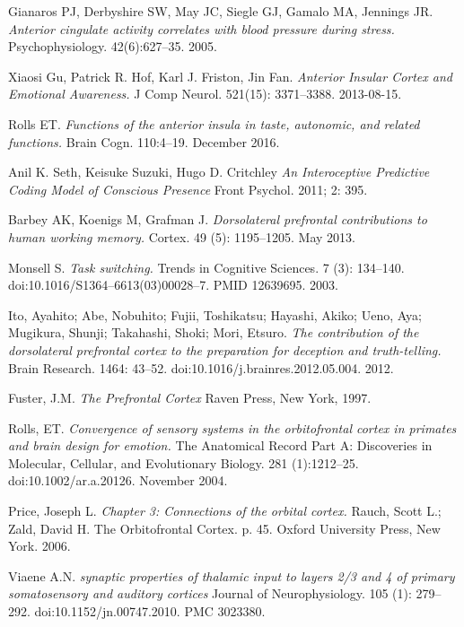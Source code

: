 \documentclass[a4paper, amsfonts, amssymb, amsmath, reprint, showkeys, nofootinbib, twoside]{revtex4-1}
\begin{document}
\begin{thebibliography}{99}
  Gianaros PJ, Derbyshire SW, May JC, Siegle GJ, Gamalo MA, Jennings JR.
  \textit{Anterior cingulate activity correlates with blood pressure during
    stress.}
  Psychophysiology. 42(6):627–35. 2005.

  Xiaosi Gu, Patrick R. Hof, Karl J. Friston, Jin Fan.
  \textit{Anterior Insular Cortex and Emotional Awareness.}
  J Comp Neurol. 521(15): 3371–3388. 2013-08-15.

  Rolls ET.
  \textit{Functions of the anterior insula in taste, autonomic, and related
    functions.}
  Brain Cogn. 110:4–19. December 2016.

  Anil K. Seth, Keisuke Suzuki, Hugo D. Critchley
  \textit {An Interoceptive Predictive Coding Model of Conscious Presence}
  Front Psychol. 2011; 2: 395.

  Barbey AK, Koenigs M, Grafman J.
  \textit{Dorsolateral prefrontal contributions to human working memory.}
  Cortex. 49 (5): 1195–1205. May 2013.

  Monsell S.
  \textit{Task switching.}
  Trends in Cognitive Sciences. 7 (3):
  134–140. doi:10.1016/S1364–6613(03)00028–7. PMID 12639695. 2003.

  Ito, Ayahito; Abe, Nobuhito; Fujii, Toshikatsu; Hayashi, Akiko; Ueno, Aya;
  Mugikura, Shunji; Takahashi, Shoki; Mori, Etsuro.
  \textit{The contribution of the dorsolateral prefrontal cortex to the preparation
    for deception and truth-telling.}
  Brain Research. 1464: 43–52. doi:10.1016/j.brainres.2012.05.004. 2012.

  Fuster, J.M.
  \textit{The Prefrontal Cortex}
  Raven Press, New York, 1997.

  Rolls, ET.
  \textit{Convergence of sensory systems in the orbitofrontal
    cortex in primates and brain design for emotion.}
  The Anatomical Record Part A: Discoveries in Molecular, Cellular, and Evolutionary
  Biology. 281 (1):1212–25. doi:10.1002/ar.a.20126. November 2004.

  Price, Joseph L.
  \textit{Chapter 3: Connections of the orbital cortex.}
  Rauch, Scott L.; Zald, David H.
  The Orbitofrontal Cortex. p. 45.
  Oxford University Press, New York. 2006.

  Viaene A.N.
  \textit {synaptic properties of thalamic input to layers 2/3 and 4 of
              primary somatosensory and auditory cortices}
  Journal of Neurophysiology. 105 (1): 279–292.
  doi:10.1152/jn.00747.2010. PMC 3023380.


\end{thebibliography}
\end{document}
